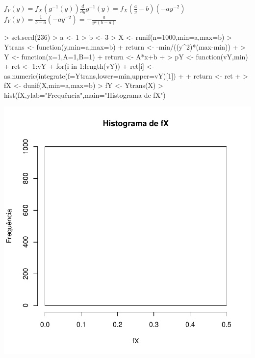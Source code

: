 \documentclass{article}
\begin{document}
  $f_Y(y) = f_X(g^{-1}(y))\frac{d}{dy}g^{-1}(y) = f_X(\frac{a}{y}-b)(-ay^{-2})$\\
  
  $f_Y(y) = \frac{1}{b-a}(-ay^{-2}) = -\frac{a}{y^2(b-a)}$
  
\begin{Schunk}
\begin{Sinput}
> set.seed(236)
> a <- 1
> b <- 3
> X <- runif(n=1000,min=a,max=b)
> Ytrans <- function(y,min=a,max=b){
+   return <- -min/((y^2)*(max-min))
+ }
> Y <- function(x=1,A=1,B=1){
+   return <- A*x+b
+ }
> pY <- function(vY,min){
+   ret <- 1:vY
+   for(i in 1:length(vY)){
+     ret[i] <- as.numeric(integrate(f=Ytrans,lower=min,upper=vY)[1])
+   }
+   return <- ret
+ }
> fX <- dunif(X,min=a,max=b)
> fY <- Ytrans(X)
> hist(fX,ylab="Frequência",main="Histograma de fX")
\end{Sinput}
\end{Schunk}
\includegraphics{transformacao-009}
\end{document}
